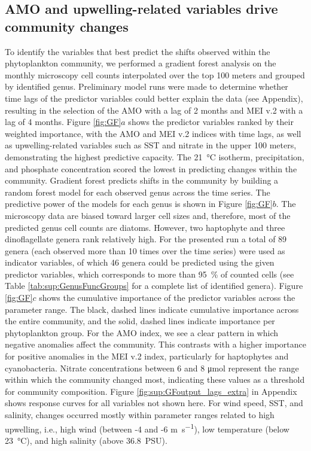\documentclass[draft]{agujournal2019}
\begin{document}
\subsection{AMO and upwelling-related variables drive community changes}
    To identify the variables that best predict the shifts observed within the phytoplankton community, we performed a gradient forest analysis on the monthly microscopy cell counts interpolated over the top 100 meters and grouped by identified genus. Preliminary model runs were made to determine whether time lags of the predictor variables could better explain the data (see Appendix), resulting in the selection of the AMO with a lag of 2 months and MEI v.2 with a lag of 4 months. Figure \ref{fig:GF}$a$ shows the predictor variables ranked by their weighted importance, with the AMO and MEI v.2 indices with time lags, as well as upwelling-related variables such as SST and nitrate in the upper 100 meters, demonstrating the highest predictive capacity. The \qty{21}{\celsius} isotherm, precipitation, and phosphate concentration scored the lowest in predicting changes within the community. Gradient forest predicts shifts in the community by building a random forest model for each observed genus across the time series. The predictive power of the models for each genus is shown in Figure \ref{fig:GF}$b$. The microscopy data are biased toward larger cell sizes and, therefore, most of the predicted genus cell counts are diatoms. However, two haptophyte and three dinoflagellate genera rank relatively high. For the presented run a total of 89 genera (each observed more than 10 times over the time series) were used as indicator variables, of which 46 genera could be predicted using the given predictor variables, which corresponds to more than \qty{95}{\%} of counted cells (see Table \ref{tab:sup:GenusFuncGroups} for a complete list of identified genera). 
    Figure \ref{fig:GF}$c$ shows the cumulative importance of the predictor variables across the parameter range. The black, dashed lines indicate cumulative importance across the entire community, and the solid, dashed lines indicate importance per phytoplankton group. For the AMO index, we see a clear pattern in which negative anomalies affect the community. This contrasts with a higher importance for positive anomalies in the MEI v.2 index, particularly for haptophytes and cyanobacteria. Nitrate concentrations between 6 and 8 \unit{\micro \mole} represent the range within which the community changed most, indicating these values as a threshold for community composition. Figure \ref{fig:sup:GFoutput_lags_extra} in Appendix shows response curves for all variables not shown here. For wind speed, SST, and salinity, changes occurred mostly within parameter ranges related to high upwelling, i.e., high wind (between -4 and -6 \unit{m.s^{-1}}), low temperature (below \qty{23}{\celsius}), and high salinity (above \qty{36.8}{PSU}). 
    
\end{document}

